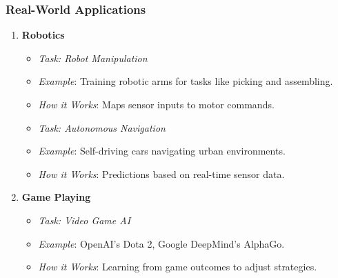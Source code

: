 \documentclass[aspectratio=169]{beamer}
\begin{document}
\begin{frame}[fragile]
    \frametitle{Real-World Applications}
    \begin{enumerate}
        \item \textbf{Robotics}
            \begin{itemize}
                \item \textit{Task: Robot Manipulation}
                \item \textit{Example}: Training robotic arms for tasks like picking and assembling.
                \item \textit{How it Works}: Maps sensor inputs to motor commands.
                
                \item \textit{Task: Autonomous Navigation}
                \item \textit{Example}: Self-driving cars navigating urban environments.
                \item \textit{How it Works}: Predictions based on real-time sensor data.
            \end{itemize}
            
        \item \textbf{Game Playing}
            \begin{itemize}
                \item \textit{Task: Video Game AI}
                \item \textit{Example}: OpenAI’s Dota 2, Google DeepMind’s AlphaGo.
                \item \textit{How it Works}: Learning from game outcomes to adjust strategies.
            \end{itemize}
    \end{enumerate}
\end{frame}
\end{document}
